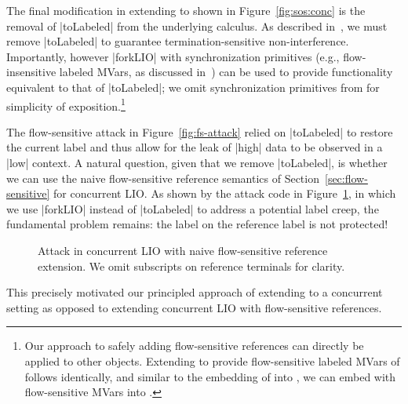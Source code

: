 The final modification in extending \lioafs{} to \lioconc{} shown in
Figure~\ref{fig:sos:conc} is the removal of |toLabeled| from the underlying
calculus.
%
As described in~\cite{stefan:addressing-covert}, we must remove |toLabeled| to
guarantee termination-sensitive non-interference.
%
Importantly, however |forkLIO| with synchronization primitives (e.g.,
flow-insensitive labeled MVars, as discussed
in~\cite{stefan:addressing-covert}) can be used to provide functionality
equivalent to that of |toLabeled|;
%
we omit synchronization primitives from \lioconc{} for simplicity of
exposition.\footnote{
Our approach to safely adding flow-sensitive references can directly
be applied to other objects.
%
Extending \lioconc{} to provide flow-sensitive labeled MVars of follows
identically, and similar to the embedding of \liofs{} into \lio{}, we can embed
\lioconc{} with flow-sensitive MVars into \lioconc.
}

The flow-sensitive attack in Figure~\ref{fig:fs-attack} relied on |toLabeled|
to restore the current label and thus allow for the leak of |high| data to be
observed in a |low| context.
%
A natural question, given that we remove |toLabeled|, is whether we can use the
naive flow-sensitive reference semantics of Section~\ref{sec:flow-sensitive}
for concurrent LIO.
%
As shown by the attack code in Figure~\ref{fig:fs-conc-attack}, in which we use
|forkLIO| instead of |toLabeled| to address a potential label creep, the
fundamental problem remains: the label on the reference label is not protected!
%
\begin{figure}
\small
{}
\cut{$}
\caption{Attack in concurrent LIO with naive flow-sensitive reference
extension. We omit subscripts on reference terminals for clarity.
\label{fig:fs-conc-attack}}
\end{figure}
%
This precisely motivated our principled approach of extending \lioafs{} to a
concurrent setting as opposed to extending concurrent LIO with flow-sensitive
references.

